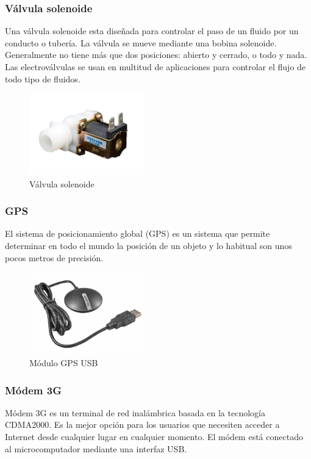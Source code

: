 \documentclass[11pt,letterpaper]{article}
\begin{document}
\subsubsection{Válvula solenoide}

Una válvula solenoide esta diseñada para controlar el paso de un fluido por un conducto o tubería. La válvula se mueve mediante una bobina solenoide. Generalmente no tiene más que dos posiciones: abierto y cerrado, o todo y nada. Las electroválvulas se usan en multitud de aplicaciones para controlar el flujo de todo tipo de fluidos.

\begin{figure}[ht!]
\caption{Válvula solenoide}
\centering
\includegraphics[width=5cm]{valvulasolenoide}
\end{figure}

\newpage

\subsubsection{GPS}

El sistema de posicionamiento global (GPS) es un sistema que permite determinar en todo el mundo la posición de un objeto y lo habitual son unos pocos metros de precisión.

\begin{figure}[ht!]
\caption{Módulo GPS USB}
\centering
\includegraphics[width=5cm]{gps}
\end{figure}

\subsubsection{Módem 3G}

Módem 3G es un terminal de red inalámbrica basada en la tecnología CDMA2000. Es la mejor opción para los usuarios que necesiten acceder a Internet desde cualquier lugar en cualquier momento. El módem está conectado al microcomputador mediante una interfaz USB.
\end{document}
